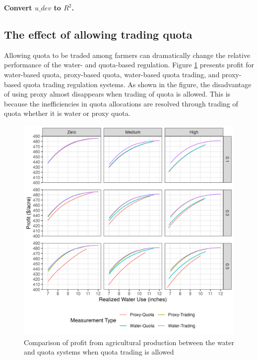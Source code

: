 \documentclass[
]{article}
\begin{document}
\textbf{Convert $u\_dev$ to $R^2$.}

\subsection{The effect of allowing trading quota}\label{the-effect-of-allowing-trading-quota}

Allowing quota to be traded among farmers can dramatically change the relative performance of the water- and quota-based regulation. Figure \ref{fig:trading-profit} presents profit for water-based quota, proxy-based quota, water-based quota trading, and proxy-based quota trading regulation systems. As shown in the figure, the disadvantage of using proxy almost disappears when trading of quota is allowed. This is because the inefficiencies in quota allocations are resolved through trading of quota whether it is water or proxy quota.

\begin{figure}[H]

{\centering \includegraphics{figures/g_trade_effect_profit} 

}

\caption{Comparison of profit from agricultural production between the water and quota systems when quota trading is allowed}\label{fig:trading-profit}
\end{figure}
\end{document}
